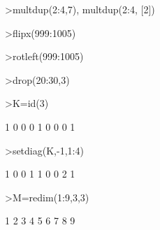 \documentclass[a4paper,10pt]{article}
\begin{document}
\begin{eulernotebook}
\begin{eulercomment}
\begin{eulercomment}
\begin{eulercomment}
\begin{eulercomment}
\begin{euleroutput}
  [2,  3,  4,  2,  3,  4,  2,  3,  4,  2,  3,  4,  2,  3,  4,  2,  3,  4,
  2,  3,  4]
\end{euleroutput}
\begin{eulerprompt}
>multdup(2:4,7), multdup(2:4, [2])
\end{eulerprompt}
\begin{euleroutput}
  [2,  2,  2,  2,  2,  2,  2,  3,  3,  3,  3,  3,  3,  3,  4,  4,  4,  4,
  4,  4,  4]
  [2,  2,  3,  3,  4,  4]
\end{euleroutput}
\begin{eulerprompt}
>flipx(999:1005)
\end{eulerprompt}
\begin{euleroutput}
  [1005,  1004,  1003,  1002,  1001,  1000,  999]
\end{euleroutput}
\begin{eulerprompt}
>rotleft(999:1005)
\end{eulerprompt}
\begin{euleroutput}
  [1000,  1001,  1002,  1003,  1004,  1005,  999]
\end{euleroutput}
\begin{eulerprompt}
>drop(20:30,3)
\end{eulerprompt}
\begin{euleroutput}
  [20,  21,  23,  24,  25,  26,  27,  28,  29,  30]
\end{euleroutput}
\begin{eulerprompt}
>K=id(3)
\end{eulerprompt}
\begin{euleroutput}
              1             0             0 
              0             1             0 
              0             0             1 
\end{euleroutput}
\begin{eulerprompt}
>setdiag(K,-1,1:4)
\end{eulerprompt}
\begin{euleroutput}
              1             0             0 
              1             1             0 
              0             2             1 
\end{euleroutput}
\begin{eulerprompt}
>M=redim(1:9,3,3)
\end{eulerprompt}
\begin{euleroutput}
              1             2             3 
              4             5             6 
              7             8             9 

\end{euleroutput}
\end{eulercomment}
\end{eulercomment}
\end{eulercomment}
\end{eulercomment}
\end{eulernotebook}
\end{document}
